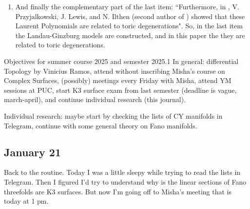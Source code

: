 \begin{enumerate}
\begin{enumerate}[label=(\alph*)]
\begin{enumerate}
			\item And finally the complementary part of the last item: ``Furthermore, in \cite{ilp13}, V. Przyjalkowski, J. Lewis, and N. Ilthen (second author of \cite{jan4}) showed that these Laurent Polynomials are related to toric degenerations". So, in the last item the Landau-Ginzburg models are constructed, and in this paper the they are related to toric degenerations.
			\end{enumerate}
	\end{enumerate}
\end{enumerate}

\begin{thing6}{Objectives for summer course 2025 and semester 2025.1}\leavevmode
In general: differential Topology by Vinicius Ramos, attend without inscribing Misha's course on Complex Surfaces, (possibly) meetings every Friday with Misha, attend YM sessions at PUC, start K3 surface exam from last semester (deadline is vague, march-april), and continue individual research (this journal).

Individual research: maybe start by checking the lists of CY manifolds in Telegram, continue with some general theory on Fano manifolds.
\end{thing6}

\subsection{January 21}

Back to the routine. Today I was a little sleepy while trying to read the lists in Telegram. Then I figured I'd try to understand why is the linear sections of Fano threefolds are K3 surfaces. But now I'm going off to Misha's meeting that is today at 1 pm.





